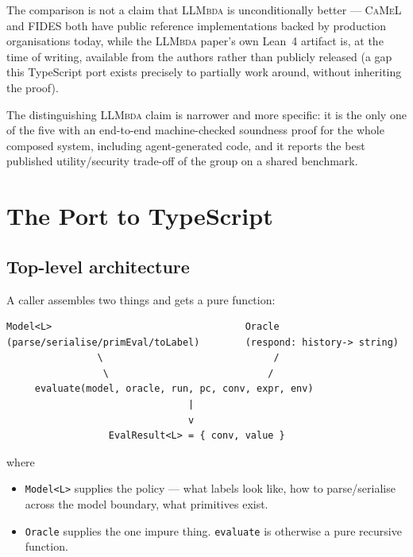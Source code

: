 \documentclass[11pt, a4paper]{article}
\newcommand{\LLMbda}{\textsc{LLMbda}\xspace}
\newcommand{\CaMeL}{\textsc{CaMeL}\xspace}
\newcommand{\FIDES}{\textsc{FIDES}\xspace}
\begin{document}
The comparison is not a claim that  \LLMbda is unconditionally better ---
\CaMeL and \FIDES both have public reference implementations backed by
production organisations today, while the  \LLMbda paper's own Lean~4
artifact is, at the time of writing, available from the authors rather
than publicly released (a gap this TypeScript port exists precisely to
partially work around, without inheriting the proof).

The distinguishing  \LLMbda claim is narrower and more specific: it is the
only one of the five with an end-to-end machine-checked soundness proof for the
whole composed system, including agent-generated code, and it reports the best
published utility/security trade-off of the group on a shared benchmark.

\section{The Port to TypeScript}

\subsection{Top-level architecture}

A caller assembles two things and gets a pure function:

\begin{lstlisting}
Model<L>                                  Oracle
(parse/serialise/primEval/toLabel)        (respond: history-> string)        
                \                              /
                 \                            /
     evaluate(model, oracle, run, pc, conv, expr, env)
                                |
                                v
                  EvalResult<L> = { conv, value }
\end{lstlisting}

where

\begin{itemize}
  \item{\lstinline{Model<L>} supplies the policy --- what labels look like, how to
	  parse/serialise across the model boundary, what primitives exist.}
  \item{\lstinline{Oracle} supplies the one impure thing. \lstinline{evaluate} is
	  otherwise a pure recursive function.}
\end{itemize}
\end{document}
